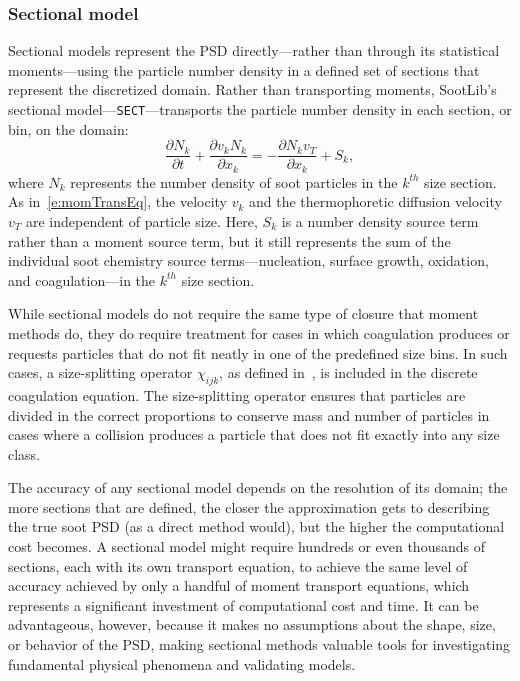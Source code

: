 \documentclass[preprint,letterpaper]{elsarticle}
\begin{document}
\subsubsection{Sectional model}
\label{s:sectional}

Sectional models represent the PSD directly---rather than through its statistical moments---using the particle number density in a defined set of sections that represent the discretized domain. Rather than transporting moments, SootLib's sectional model---\texttt{SECT}---transports the particle number density in each section, or bin, on the domain:
\begin{equation} \label{e:psd-sectional}
\frac{\partial N_k}{\partial t} + \frac{\partial v_k N_k}{\partial x_k} = -\frac{\partial N_k v_T}{\partial x_k} + S_k,
\end{equation}
where $N_k$ represents the number density of soot particles in the $k^{th}$ size section. As in~\eqref{e:momTransEq}, the velocity $v_k$ and the thermophoretic diffusion velocity $v_T$ are independent of particle size. Here, $S_k$ is a number density source term rather than a moment source term, but it still represents the sum of the individual soot chemistry source terms---nucleation, surface growth, oxidation, and coagulation---in the $k^{th}$ size section.

While sectional models do not require the same type of closure that moment methods do, they do require treatment for cases in which coagulation produces or requests particles that do not fit neatly in one of the predefined size bins. In such cases, a size-splitting operator $\chi_{ijk}$, as defined in~\cite{Lehtinen_2001}, is included in the discrete coagulation equation. The size-splitting operator ensures that particles are divided in the correct proportions to conserve mass and number of particles in cases where a collision produces a particle that does not fit exactly into any size class.

The accuracy of any sectional model depends on the resolution of its domain; the more sections that are defined, the closer the approximation gets to describing the true soot PSD (as a direct method would), but the higher the computational cost becomes. A sectional model might require hundreds or even thousands of sections, each with its own transport equation, to achieve the same level of accuracy achieved by only a handful of moment transport equations, which represents a significant investment of computational cost and time. It can be advantageous, however, because it makes no assumptions about the shape, size, or behavior of the PSD, making sectional methods valuable tools for investigating fundamental physical phenomena and validating models.
\end{document}

